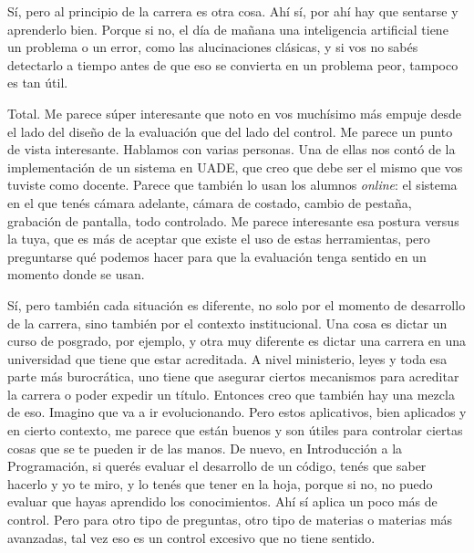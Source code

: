 \begin{description}[leftmargin=0cm, labelsep=0.5cm, style=nextline]
\item[\textbf{Entrevistado:}] Sí, pero al principio de la carrera es otra cosa. Ahí sí, por ahí hay que sentarse y aprenderlo bien. Porque si no, el día de mañana una inteligencia artificial tiene un problema o un error, como las alucinaciones clásicas, y si vos no sabés detectarlo a tiempo antes de que eso se convierta en un problema peor, tampoco es tan útil.
\item[\textbf{Entrevistadores:}] Total. Me parece súper interesante que noto en vos muchísimo más empuje desde el lado del diseño de la evaluación que del lado del control. Me parece un punto de vista interesante. Hablamos con varias personas. Una de ellas nos contó de la implementación de un sistema en UADE, que creo que debe ser el mismo que vos tuviste como docente. Parece que también lo usan los alumnos \textit{online}: el sistema en el que tenés cámara adelante, cámara de costado, cambio de pestaña, grabación de pantalla, todo controlado. Me parece interesante esa postura versus la tuya, que es más de aceptar que existe el uso de estas herramientas, pero preguntarse qué podemos hacer para que la evaluación tenga sentido en un momento donde se usan.
\item[\textbf{Entrevistado:}] Sí, pero también cada situación es diferente, no solo por el momento de desarrollo de la carrera, sino también por el contexto institucional. Una cosa es dictar un curso de posgrado, por ejemplo, y otra muy diferente es dictar una carrera en una universidad que tiene que estar acreditada. A nivel ministerio, leyes y toda esa parte más burocrática, uno tiene que asegurar ciertos mecanismos para acreditar la carrera o poder expedir un título. Entonces creo que también hay una mezcla de eso. Imagino que va a ir evolucionando. Pero estos aplicativos, bien aplicados y en cierto contexto, me parece que están buenos y son útiles para controlar ciertas cosas que se te pueden ir de las manos. De nuevo, en Introducción a la Programación, si querés evaluar el desarrollo de un código, tenés que saber hacerlo y yo te miro, y lo tenés que tener en la hoja, porque si no, no puedo evaluar que hayas aprendido los conocimientos. Ahí sí aplica un poco más de control. Pero para otro tipo de preguntas, otro tipo de materias o materias más avanzadas, tal vez eso es un control excesivo que no tiene sentido.

\end{description}
